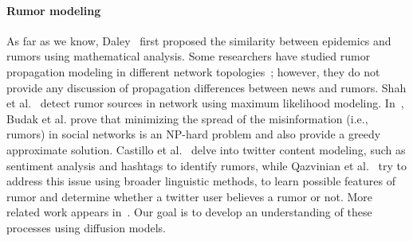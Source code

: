 \paragraph{Rumor modeling}
As far as we know, Daley~\cite{Daley-nature-1964} first proposed the similarity between epidemics and rumors using mathematical analysis. Some researchers have studied rumor propagation modeling in different network topologies~\cite{nekovee2007theory,zanette2002dynamics}; however,
they do not provide any discussion of propagation differences between news and rumors.
Shah et al.~\cite{shah2011rumors} detect rumor sources in network using maximum likelihood modeling.
In~\cite{budak2011limiting}, Budak et al. prove that minimizing the spread of the misinformation (i.e., rumors)
in social networks is an NP-hard problem and also provide
a greedy approximate solution. Castillo et al.~\cite{castillo2011information} delve into twitter content modeling, such as sentiment analysis and
hashtags to identify rumors, while Qazvinian et al.~\cite{qazvinian2011rumor} try to address this issue using broader linguistic methods,
to learn possible features of rumor and determine whether a twitter
user believes a rumor or not. More related work appears
in~\cite{Isham-physica-2009,PhysRevE.81.056102}. Our goal is to develop an understanding of
these processes using diffusion models.
%
%

